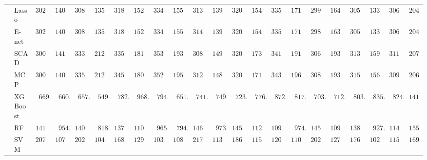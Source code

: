 \begin{tabular}{p{0.2cm}p{1cm}|p{0.6cm}p{0.6cm}|p{0.6cm}p{0.6cm}p{0.6cm}p{0.6cm}p{0.6cm}p{0.6cm}|p{0.6cm}p{0.6cm}p{0.6cm}p{0.6cm}p{0.6cm}p{0.6cm}|p{0.6cm}p{0.6cm}p{0.6cm}p{0.6cm}p{0.6cm}p{0.6cm}}
 & Lasso  & $3020.04$ & $1402.02$ & $3083.70$ & $1351.14$ & $3185.17$ & $1520.39$ & $3348.09$ & $1556.13$ & $3139.22$ & $1391.06$ & $3209.15$ & $1547.39$ & $3352.05$ & $1719.77$ & $2990.72$ & $1642.48$ & $3052.12$ & $1339.77$ & $3061.42$ & $2046.11$ \\
 & E-net  & $3020.38$ & $1401.55$ & $3083.59$ & $1350.98$ & $3186.40$ & $1526.71$ & $3346.17$ & $1553.01$ & $3140.15$ & $1390.47$ & $3207.61$ & $1544.02$ & $3350.89$ & $1713.66$ & $2989.50$ & $1637.55$ & $3052.69$ & $1339.98$ & $3061.47$ & $2044.23$ \\
 & SCAD  & $3008.60$ & $1419.50$ & $3336.62$ & $2121.56$ & $3356.30$ & $1813.53$ & $3531.73$ & $1939.65$ & $3088.41$ & $1491.17$ & $3209.68$ & $1736.18$ & $3412.80$ & $1916.87$ & $3068.85$ & $1937.80$ & $3139.39$ & $1596.98$ & $3111.24$ & $2070.88$ \\
 & MCP  & $3006.58$ & $1409.95$ & $3356.26$ & $2125.56$ & $3457.17$ & $1809.90$ & $3521.21$ & $1956.99$ & $3128.34$ & $1482.91$ & $3201.48$ & $1716.84$ & $3436.23$ & $1965.21$ & $3085.66$ & $1936.54$ & $3152.14$ & $1564.80$ & $3096.02$ & $2065.46$ \\
 & XGBoost  & $\phantom{0}669.76$ & $\phantom{0}660.72$ & $\phantom{0}657.71$ & $\phantom{0}549.66$ & $\phantom{0}782.09$ & $\phantom{0}968.31$ & $\phantom{0}794.54$ & $\phantom{0}651.13$ & $\phantom{0}741.10$ & $\phantom{0}749.05$ & $\phantom{0}723.97$ & $\phantom{0}776.08$ & $\phantom{0}872.37$ & $\phantom{0}817.07$ & $\phantom{0}703.90$ & $\phantom{0}712.53$ & $\phantom{0}803.31$ & $\phantom{0}835.82$ & $\phantom{0}824.42$ & $1410.27$ \\
 & RF  & $1417.71$ & $\phantom{0}954.68$ & $1409.67$ & $\phantom{0}818.83$ & $1373.20$ & $1105.85$ & $\phantom{0}965.65$ & $\phantom{0}794.34$ & $1463.75$ & $\phantom{0}973.83$ & $1451.43$ & $1123.72$ & $1099.23$ & $\phantom{0}974.36$ & $1454.33$ & $1093.27$ & $1386.90$ & $\phantom{0}927.00$ & $1141.59$ & $1556.76$ \\
 & SVM  & $2073.77$ & $1075.82$ & $2029.33$ & $1045.37$ & $1686.63$ & $1297.79$ & $1030.44$ & $1088.13$ & $2170.74$ & $1133.48$ & $1865.53$ & $1152.00$ & $1200.73$ & $1108.62$ & $2025.37$ & $1270.25$ & $1760.98$ & $1023.32$ & $1157.63$ & $1691.99$ \\
\hline 
\end{tabular}

